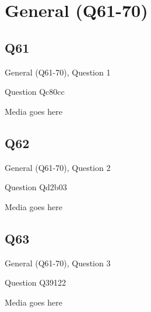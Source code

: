 \documentclass[11pt]{beamer}
\begin{document}
\section{General (Q61-70)}
    

\subsection*{Q61}
\begin{frame}[t]{General (Q61-70), Question 1}
\vspace{2em}
\begin{block}{Question}
Qc80cc
\end{block}
\begin{center}
Media goes here
\end{center}
\end{frame}
    

\subsection*{Q62}
\begin{frame}[t]{General (Q61-70), Question 2}
\vspace{2em}
\begin{block}{Question}
Qd2b03
\end{block}
\begin{center}
Media goes here
\end{center}
\end{frame}
    

\subsection*{Q63}
\begin{frame}[t]{General (Q61-70), Question 3}
\vspace{2em}
\begin{block}{Question}
Q39122
\end{block}
\begin{center}
Media goes here
\end{center}
\end{frame}
    
\end{document}
